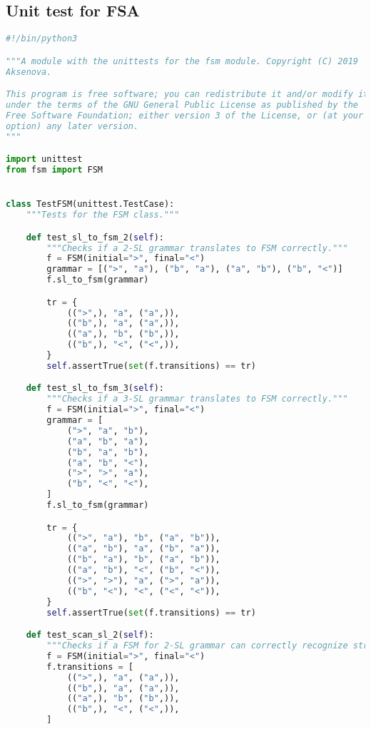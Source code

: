 \subsection*{Unit test for FSA}

\begin{lstlisting}[language=Python]
#!/bin/python3

"""A module with the unittests for the fsm module. Copyright (C) 2019  Alena
Aksenova.

This program is free software; you can redistribute it and/or modify it
under the terms of the GNU General Public License as published by the
Free Software Foundation; either version 3 of the License, or (at your
option) any later version.
"""

import unittest
from fsm import FSM


class TestFSM(unittest.TestCase):
    """Tests for the FSM class."""

    def test_sl_to_fsm_2(self):
        """Checks if a 2-SL grammar translates to FSM correctly."""
        f = FSM(initial=">", final="<")
        grammar = [(">", "a"), ("b", "a"), ("a", "b"), ("b", "<")]
        f.sl_to_fsm(grammar)

        tr = {
            ((">",), "a", ("a",)),
            (("b",), "a", ("a",)),
            (("a",), "b", ("b",)),
            (("b",), "<", ("<",)),
        }
        self.assertTrue(set(f.transitions) == tr)

    def test_sl_to_fsm_3(self):
        """Checks if a 3-SL grammar translates to FSM correctly."""
        f = FSM(initial=">", final="<")
        grammar = [
            (">", "a", "b"),
            ("a", "b", "a"),
            ("b", "a", "b"),
            ("a", "b", "<"),
            (">", ">", "a"),
            ("b", "<", "<"),
        ]
        f.sl_to_fsm(grammar)

        tr = {
            ((">", "a"), "b", ("a", "b")),
            (("a", "b"), "a", ("b", "a")),
            (("b", "a"), "b", ("a", "b")),
            (("a", "b"), "<", ("b", "<")),
            ((">", ">"), "a", (">", "a")),
            (("b", "<"), "<", ("<", "<")),
        }
        self.assertTrue(set(f.transitions) == tr)

    def test_scan_sl_2(self):
        """Checks if a FSM for 2-SL grammar can correctly recognize strings."""
        f = FSM(initial=">", final="<")
        f.transitions = [
            ((">",), "a", ("a",)),
            (("b",), "a", ("a",)),
            (("a",), "b", ("b",)),
            (("b",), "<", ("<",)),
        ]


\end{lstlisting}
